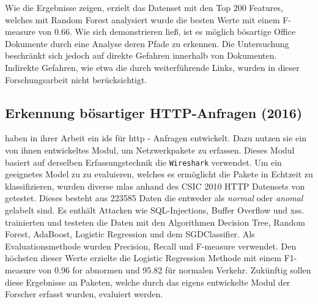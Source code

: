 \documentclass[
    12pt, %
    DIV10,
    ngerman, %
    a4paper, %
    oneside, %
    titlepage, %
    parskip=half, %
    headings=normal, %
    listof=totoc, %
    bibliography=totoc, %
    index=totoc, %
    captions=tableheading, %
    final %
]{scrreprt}
\begin{document}
Wie die Ergebnisse zeigen, erzielt das Datenset mit den Top 200 Features, welches mit Random Forest analysiert wurde die besten Werte mit einem F-measure von 0.66.
Wie sich demonstrieren ließ, ist es möglich bösartige Office Dokumente durch eine Analyse deren Pfade zu erkennen. 
Die Untersuchung beschränkt sich jedoch auf direkte Gefahren innerhalb von Dokumenten. Indirekte Gefahren, wie etwa die durch weiterführende Links, wurden in dieser Forschungsarbeit nicht berücksichtigt.
\subsection{Erkennung bösartiger HTTP-Anfragen (2016)}\label{csic}
\textcite{Pham2016} haben in ihrer Arbeit ein \ac{ids} für \ac{http} - Anfragen entwickelt. Dazu nutzen sie ein von ihnen entwickeltes Modul, um Netzwerkpakete zu erfassen. Dieses Modul basiert auf derselben Erfassungstechnik die \texttt{Wireshark} verwendet. Um ein geeignetes Model zu zu evaluieren, welches es ermöglicht die Pakete in Echtzeit zu klassifizieren, wurden diverse \ac{mlas} anhand des CSIC 2010 HTTP Datensets von \textcite{csic} getestet. Dieses besteht aus 223585 Daten die entweder als \emph{normal} oder \emph{anomal} gelabelt sind. Es enthält Attacken wie SQL-Injections, Buffer Overflow und \ac{xss}. \textcite{Pham2016} trainierten und testeten die Daten mit den Algorithmen Decision Tree, Random Forest, AdaBoost, Logistic Regression und dem  SGDClassifier. Als Evaluationsmethode wurden Precision, Recall und F-measure verwendet. Den höchsten dieser Werte erzielte die Logistic Regression Methode mit einem F1-measure von 0.96 for abnormen und 95.82 für normalen Verkehr. Zukünftig sollen diese Ergebnisse an Paketen, welche durch das eigens entwickelte Modul der Forscher erfasst wurden, evaluiert werden.
%
\end{document}
